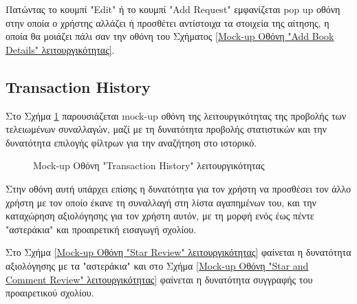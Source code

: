 \documentclass[12pt,a4paper]{article}
\begin{document}
Πατώντας το κουμπί "Edit" ή το κουμπί "Add Request" εμφανίζεται pop up οθόνη στην οποία ο χρήστης αλλάζει ή προσθέτει αντίστοιχα τα στοιχεία της αίτησης, η οποία θα μοιάζει πάλι σαν την οθόνη του Σχήματος \ref{Mock-up Οθόνη "Add Book Details" λειτουργικότητας}.


\subsection{Transaction History}

Στο Σχήμα \ref{Mock-up Οθόνη "Transaction History" λειτουργικότητας} παρουσιάζεται mock-up οθόνη της λειτουργικότητας της προβολής των τελειωμένων συναλλαγών, μαζί με τη δυνατότητα προβολής στατιστικών και την δυνατότητα επιλογής φίλτρων για την αναζήτηση στο ιστορικό.

\begin{figure}[H]
	\caption{Mock-up Οθόνη "Transaction History" λειτουργικότητας}
	\label{Mock-up Οθόνη "Transaction History" λειτουργικότητας}
\end{figure}

Στην οθόνη αυτή υπάρχει επίσης η δυνατότητα για τον χρήστη να προσθέσει τον άλλο χρήστη με τον οποίο έκανε τη συναλλαγή στη λίστα αγαπημένων του, και την καταχώρηση αξιολόγησης για τον χρήστη αυτόν, με τη μορφή ενός έως πέντε "αστεράκια" και προαιρετική εισαγωγή σχολίου.

Στο Σχήμα \ref{Mock-up Οθόνη "Star Review" λειτουργικότητας} φαίνεται η δυνατότητα αξιολόγησης με τα "αστεράκια" και στο Σχήμα \ref{Mock-up Οθόνη "Star and Comment Review" λειτουργικότητας} φαίνεται η δυνατότητα συγγραφής του προαιρετικού σχολίου.
\end{document}
